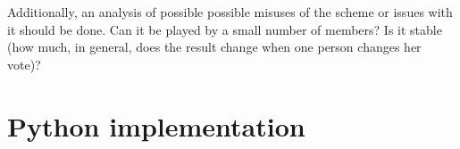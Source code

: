 \documentclass[a4paper]{acm_proc_article-sp}
\begin{document}
Additionally, an analysis of possible possible misuses of the scheme or issues with it should be done. Can it be played by a small number of members? Is it stable (how much, in general, does the result change when one person changes her vote)?





\onecolumn

\appendix
\section{Python implementation}

\vspace{1em}

\small


%
\end{document}
